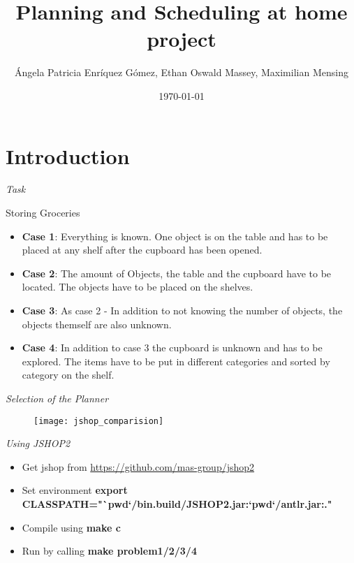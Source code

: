 \documentclass{beamer}
\title{Planning and Scheduling at home project}
\date{\today}
\author{\'{A}ngela Patricia Enr\'{i}quez G\'{o}mez, Ethan Oswald Massey, Maximilian Mensing}
\institute{BRSU}
\begin{document}
\maketitle


\section{Introduction}

\begin{frame}{\textsl{ Task }}

Storing Groceries

\begin{itemize}
	\item \textbf{Case 1}: Everything is known. One object is on the table and has to be placed at any shelf after the cupboard has been opened.
	\item \textbf{Case 2}: The amount of Objects, the table and the cupboard have to be located. The objects have to be placed on the shelves.
	\item \textbf{Case 3}: As case 2 - In addition to not knowing the number of objects, the objects themself are also unknown.
	\item \textbf{Case 4}: In addition to case 3 the cupboard is unknown and has to be explored. The items have to be put in different categories and sorted by category on the shelf.
\end{itemize}

\end{frame}

\begin{frame}{\textsl{Selection of the Planner}}
	  
\begin{figure}
	\centering
	\texttt{[image: jshop\_comparision]}
	\label{fig:kim}
\end{figure}

\end{frame}


\begin{frame}{\textsl{Using JSHOP2}}
	\begin{itemize}
		\item Get jshop from \url{https://github.com/mas-group/jshop2}
		\item Set environment \textbf{{\tiny export CLASSPATH="`pwd`/bin.build/JSHOP2.jar:`pwd`/antlr.jar:."}}
		\item Compile using \textbf{{\tiny make c}}
		\item Run by calling \textbf{{\tiny make problem1/2/3/4}}
	\end{itemize}

\end{frame}
\end{document}

